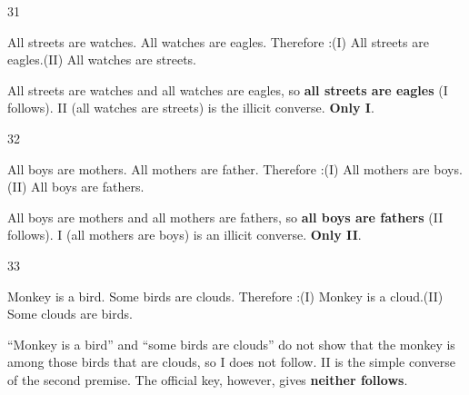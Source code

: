 \begin{question}{31}
{All streets are watches. All watches are eagles. Therefore :\newline (I) All streets are eagles.\newline (II) All watches are streets.\par}
\begin{explain}
\begin{center}\end{center}
All streets are watches and all watches are eagles, so \textbf{all streets are eagles} (I follows). II (all watches are streets) is the illicit converse. \textbf{Only I}.
\end{explain}
\end{question}

\begin{question}{32}
{All boys are mothers. All mothers are father. Therefore :\newline (I) All mothers are boys.\newline (II) All boys are fathers.\par}
\begin{explain}
All boys are mothers and all mothers are fathers, so \textbf{all boys are fathers} (II follows). I (all mothers are boys) is an illicit converse. \textbf{Only II}.
\end{explain}
\end{question}

\begin{question}{33}
{Monkey is a bird. Some birds are clouds. Therefore :\newline (I) Monkey is a cloud.\newline (II) Some clouds are birds.\par}
\begin{explain}
``Monkey is a bird'' and ``some birds are clouds'' do not show that the monkey is among those birds that are clouds, so I does not follow. II is the simple converse of the second premise. The official key, however, gives \textbf{neither follows}.
\end{explain}
\end{question}

